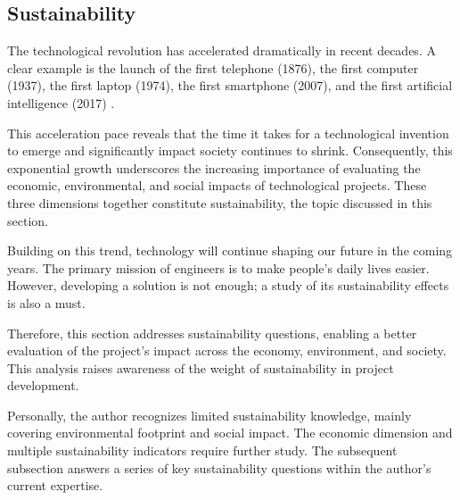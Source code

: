 \vspace{10pt}

\subsection{Sustainability}

The technological revolution has accelerated dramatically in recent decades. A clear example is the launch of the first telephone (1876), the first computer (1937), the first laptop (1974), the first smartphone (2007), and the first artificial intelligence (2017) \cite{history-of-technology-timeline}.

This acceleration pace reveals that the time it takes for a technological invention to emerge and significantly impact society continues to shrink. Consequently, this exponential growth underscores the increasing importance of evaluating the economic, environmental, and social impacts of technological projects. These three dimensions together constitute sustainability, the topic discussed in this section.

Building on this trend, technology will continue shaping our future in the coming years. The primary mission of engineers is to make people's daily lives easier. However, developing a solution is not enough; a study of its sustainability effects is also a must. 

Therefore, this section addresses sustainability questions, enabling a better evaluation of the project's impact across the economy, environment, and society. This analysis raises awareness of the weight of sustainability in project development.

Personally, the author recognizes limited sustainability knowledge, mainly covering environmental footprint and social impact. The economic dimension and multiple sustainability indicators require further study. The subsequent subsection answers a series of key sustainability questions within the author's current expertise.






